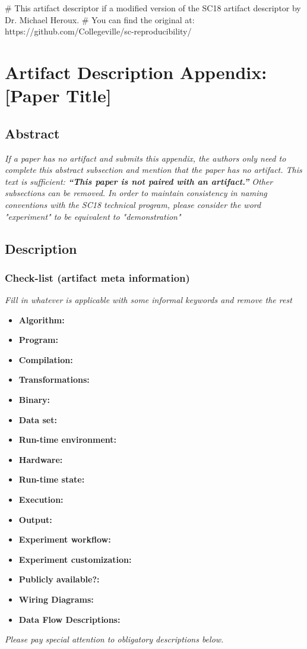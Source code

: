 # This artifact descriptor if a modified version of the SC18 artifact descriptor by Dr. Michael Heroux.
# You can find the original at: https://github.com/Collegeville/sc-reproducibility/

\appendix

\section{Artifact Description Appendix: [Paper Title]}


\subsection{Abstract}

{\em If a paper has no artifact and submits this appendix, the authors only need to complete this abstract subsection and mention that the paper has no artifact.  This text is sufficient: \textbf{``This paper is not paired with an artifact.''}  Other subsections can be removed. In order to maintain consistency in naming conventions with the SC18 technical program, please consider the word "experiment" to be equivalent to "demonstration"} 


\subsection{Description}

\subsubsection{Check-list (artifact meta information)}

{\em Fill in whatever is applicable with some informal keywords and remove the rest}

{\small
\begin{itemize}
  \item {\bf Algorithm: }
  \item {\bf Program: }
  \item {\bf Compilation: }
  \item {\bf Transformations: }
  \item {\bf Binary: }
  \item {\bf Data set: }
  \item {\bf Run-time environment: }
  \item {\bf Hardware: }
  \item {\bf Run-time state: }
  \item {\bf Execution: }
  \item {\bf Output: }
  \item {\bf Experiment workflow: }
  \item {\bf Experiment customization: }
  \item {\bf Publicly available?: }
  \item {\bf Wiring Diagrams: }
  \item {\bf Data Flow Descriptions: }
  
\end{itemize}
}
{\em Please pay special attention to obligatory descriptions below.}

